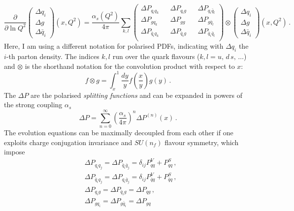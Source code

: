 \begin{equation}
  \frac{\partial}{\partial \ln Q^2} 
  \left(\begin{matrix}
    \Delta q_i \\
    \Delta g \\
    \Delta \bar{q}_i
  \end{matrix} \right) (x,Q^2) = \frac{\alpha_{s}(Q^2)}{4 \pi}  \sum_{k,l}
  \left(\begin{matrix}
    \Delta P_{q_i q_k} && \Delta P_{q_i g} && \Delta P_{q_i \bar{q}_l} \\
    \Delta P_{g q_k} && \Delta P_{g g} && \Delta P_{g \bar{q}_l} \\
    \Delta P_{\bar{q}_i q_k} && \Delta P_{\bar{q}_i g} && \Delta P_{\bar{q}_i \bar{q}_l} \\
  \end{matrix}\right) \otimes 
  \left(\begin{matrix}
    \Delta q_i \\
    \Delta g \\
    \Delta \bar{q}_i
  \end{matrix} \right) (x,Q^2) \,.
  \label{eq:DGLAP_coupled}
\end{equation}
Here, I am using a different notation for polarised PDFs, indicating with $\Delta q_i$ the $i$-th parton density. The indices $k,l$ run over the quark flavours ($k,l = u,\, d\, s,\, \dots$) and $\otimes$ is the shorthand notation for the convolution product with respect to $x$:
\begin{equation}
  f \otimes g = \int_{x}^{1} \frac{dy}{y} f \left(\frac{x}{y} \right) g(y) \,.
  \label{eq:def_conv}
\end{equation}
The $\Delta P$ are the polarised \textit{splitting functions} and can be expanded in powers of the strong coupling $\alpha_s$
\begin{equation}
  \Delta P = \sum_{n=0}^{\infty} \left( \frac{\alpha_s}{4\pi} \right)^{n} \Delta P^{(n)}(x)\,.
\end{equation}
The evolution equations can be maximally decoupled from each other if one exploits charge conjugation invariance and $SU(n_f)$ flavour symmetry, which impose 
\begin{equation}
  \begin{split}
    & \Delta P_{q_i q_j} = \Delta P_{\bar{q}_i \bar{q}_j} = \delta_{ij} P_{qq}^{V} + P_{qq}^{S} \,,\\
    & \Delta P_{\bar{q}_i q_j} = \Delta P_{q_i \bar{q}_j} = \delta_{ij} P_{\bar{q}q}^{V} + P_{\bar{q}q}^{S} \,,\\
    & \Delta P_{q_i g} = \Delta P_{\bar{q}_i g} = \Delta P_{qg} \,, \\
    & \Delta P_{g q_i} = \Delta P_{g \bar{q}_i} = \Delta P_{gq}
  \end{split}
\end{equation}
